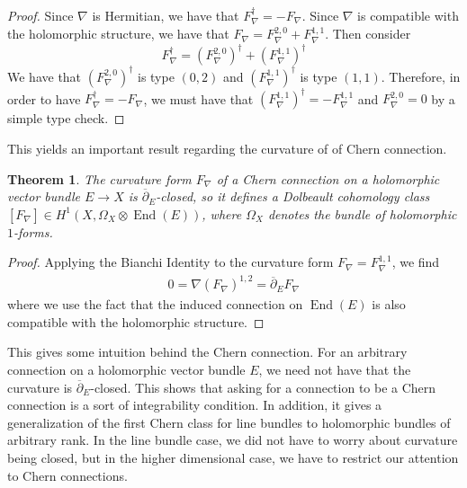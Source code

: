 \documentclass[psamsfonts, 12pt]{amsart}
\newtheorem{thm}{Theorem}[section]
\theoremstyle{definition}
\theoremstyle{remark}
\newcommand{\dbar}{\overline{\partial}}
\DeclareMathOperator{\End}{End}
\begin{document}
%
\begin{proof}
Since $\nabla$ is Hermitian, we have that $F_\nabla^\dagger = - F_\nabla$.
Since $\nabla$ is compatible with the holomorphic structure, we have that
$F_\nabla = F^{2,0}_\nabla + F^{1,1}_\nabla$. Then consider
\[
F_\nabla^\dagger = (F^{2,0}_\nabla)^\dagger + (F^{1,1}_\nabla)^\dagger
\]
We have that $(F^{2,0}_\nabla)^\dagger$ is type $(0,2)$ and $(F^{1,1}_\nabla)^\dagger$
is type $(1,1)$. Therefore, in order to have $F_\nabla^\dagger = -F_\nabla$, we
must have that $(F^{1,1}_\nabla)^\dagger = -F^{1,1}_\nabla$ and $F^{2,0}_\nabla = 0$
by a simple type check.
\end{proof}
%
This yields an important result regarding the curvature of of Chern connection.
%
\begin{thm}
The curvature form $F_\nabla$ of a Chern connection on a holomorphic vector
bundle $E \to X$ is $\dbar_E$-closed, so it defines a Dolbeault cohomology class
$[F_\nabla] \in H^1(X, \Omega_X \otimes \End(E))$, where $\Omega_X$ denotes the
bundle of holomorphic $1$-forms.
\end{thm}
%
\begin{proof}
Applying the Bianchi Identity to the curvature form $F_\nabla = F_\nabla^{1,1}$,
we find
\begin{align*}
0 = \nabla(F_\nabla)^{1,2} = \dbar_E F_\nabla
\end{align*}
where we use the fact that the induced connection on $\End(E)$ is also
compatible with the holomorphic structure.
\end{proof}
%
This gives some intuition behind the Chern connection. For an arbitrary connection on
a holomorphic vector bundle $E$, we need not have that the curvature is
$\dbar_E$-closed. This shows that asking for a connection to be a Chern connection
is a sort of integrability condition. In addition, it gives a generalization of the
first Chern class for line bundles to holomorphic bundles of arbitrary rank. In
the line bundle case, we did not have to worry about curvature being closed,
but in the higher dimensional case, we have to restrict our attention to Chern
connections.
\end{document}
